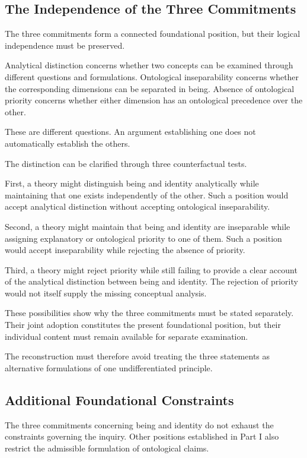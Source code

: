 \subsection{The Independence of the Three Commitments}

The three commitments form a connected foundational
position, but their logical independence must be preserved.

Analytical distinction concerns whether two concepts
can be examined through different questions and
formulations. Ontological inseparability concerns
whether the corresponding dimensions can be separated
in being. Absence of ontological priority concerns
whether either dimension has an ontological precedence
over the other.

These are different questions. An argument establishing
one does not automatically establish the others.

The distinction can be clarified through three
counterfactual tests.

First, a theory might distinguish being and identity
analytically while maintaining that one exists independently
of the other. Such a position would accept analytical
distinction without accepting ontological inseparability.

Second, a theory might maintain that being and identity
are inseparable while assigning explanatory or ontological
priority to one of them. Such a position would accept
inseparability while rejecting the absence of priority.

Third, a theory might reject priority while still failing
to provide a clear account of the analytical distinction
between being and identity. The rejection of priority
would not itself supply the missing conceptual analysis.

These possibilities show why the three commitments
must be stated separately. Their joint adoption constitutes
the present foundational position, but their individual
content must remain available for separate examination.

The reconstruction must therefore avoid treating the
three statements as alternative formulations of one
undifferentiated principle.

\subsection{Additional Foundational Constraints}

The three commitments concerning being and identity
do not exhaust the constraints governing the inquiry.
Other positions established in Part I also restrict
the admissible formulation of ontological claims.

